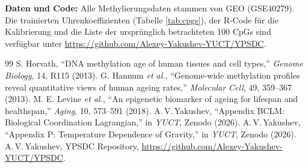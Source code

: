 \documentclass[12pt,a4paper]{article}
\begin{document}
	\vspace{0.5cm}
	\noindent\textbf{Daten und Code:} Alle Methylierungsdaten stammen von GEO (GSE40279). Die trainierten Uhrenkoeffizienten (Tabelle \ref{tab:cpgs}), der R‑Code für die Kalibrierung und die Liste der ursprünglich betrachteten 100 CpGs sind verfügbar unter \url{https://github.com/Alexey-Yakushev-YUCT/YPSDC}.
	
	\begin{thebibliography}{99}
		 S. Horvath, ``DNA methylation age of human tissues and cell types,'' \emph{Genome Biology}, 14, R115 (2013).
		 G. Hannum \emph{et al.}, ``Genome‑wide methylation profiles reveal quantitative views of human ageing rates,'' \emph{Molecular Cell}, 49, 359--367 (2013).
		 M. E. Levine \emph{et al.}, ``An epigenetic biomarker of ageing for lifespan and healthspan,'' \emph{Aging}, 10, 573--591 (2018).
		 A.\,V.\,Yakushev, ``Appendix BCLM: Biological Coordination Lagrangian,'' in \emph{YUCT}, Zenodo (2026).
		 A.\,V.\,Yakushev, ``Appendix P: Temperature Dependence of Gravity,'' in \emph{YUCT}, Zenodo (2026).
		 A.\,V.\,Yakushev, YPSDC Repository, \url{https://github.com/Alexey-Yakushev-YUCT/YPSDC}.
	\end{thebibliography}
	
\end{document}
